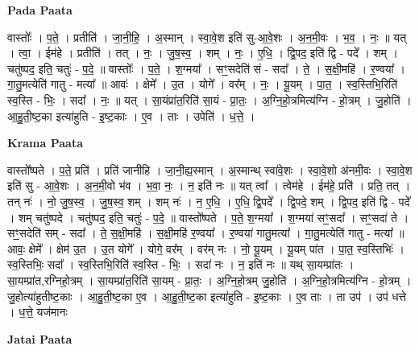 \documentclass[17pt]{extarticle}
\begin{document}
\textbf{Pada Paata} \newline

वास्तोः᳚ । प॒ते॒ । प्रतीति॑ । जा॒नी॒हि॒ । अ॒स्मान् । स्वा॒वे॒श इति॑ सु-आ॒वे॒शः । अ॒न॒मी॒वः । भ॒व॒ । नः॒ ॥ यत् । त्वा॒ । ईम॑हे । प्रतीति॑ । तत् । नः॒ । जु॒ष॒स्व॒ । शम् । नः॒ । ए॒धि॒ । द्वि॒पद॒ इति॑ द्वि - पदे᳚ । शम् । चतु॑ष्पद॒ इति॒ चतुः॑ - प॒दे॒ ॥ वास्तोः᳚ । प॒ते॒ । श॒ग्मया᳚ । सꣳ॒॒सदेति॑ सं - सदा᳚ । ते॒ । स॒क्षी॒महि॑ । र॒ण्वया᳚ । गा॒तु॒मत्येति॑ गातु - मत्या᳚ ॥ आवः॑ । क्षेमे᳚ । उ॒त । योगे᳚ । वर᳚म् । नः॒ । यू॒यम् । पा॒त॒ । स्व॒स्तिभि॒रिति॑ स्व॒स्ति - भिः॒ । सदा᳚ । नः॒ ॥ यत् । सा॒यंप्रा॑त॒रिति॑ सा॒यं - प्रा॒तः॒ । अ॒ग्नि॒हो॒त्रमित्य॑ग्नि - हो॒त्रम् । जु॒होति॑ । आ॒हु॒ती॒ष्ट॒का इत्या॑हुति - इ॒ष्ट॒काः । ए॒व । ताः । उपेति॑ । ध॒त्ते॒ ।  \newline


\textbf{Krama Paata} \newline

वास्तो᳚ष्पते । प॒ते॒ प्रति॑ । प्रति॑ जानीहि । जा॒नी॒ह्य॒स्मान् । अ॒स्मान्थ् स्वा॑वे॒शः । स्वा॒वे॒शो अ॑नमी॒वः । स्वा॒वे॒श इति॑ सु - आ॒वे॒शः । अ॒न॒मी॒वो भ॑व । भ॒वा॒ नः॒ । न॒ इति॑ नः ॥ यत् त्वा᳚ । त्वेम॑हे । ईम॑हे॒ प्रति॑ । प्रति॒ तत् । तन् नः॑ । नो॒ जु॒ष॒स्व॒ । जु॒ष॒स्व॒ शम् । शम् नः॑ । न॒ ए॒धि॒ । ए॒धि॒ द्वि॒पदे᳚ । द्वि॒पदे॒ शम् । द्वि॒पद॒ इति॑ द्वि - पदे᳚ । शम् चतु॑ष्पदे । चतु॑ष्पद॒ इति॒ चतुः॑ - प॒दे॒ ॥ वास्तो᳚ष्पते । प॒ते॒ श॒ग्मया᳚ । श॒ग्मया॑ सꣳ॒॒सदा᳚ । सꣳ॒॒सदा॑ ते । सꣳ॒॒सदेति॑ सम् - सदा᳚ । ते॒ स॒क्षी॒महि॑ । स॒क्षी॒महि॑ र॒ण्वया᳚ । र॒ण्वया॑ गातु॒मत्या᳚ । गा॒तु॒मत्येति॑ गातु - मत्या᳚ ॥ आवः॒ क्षेमे᳚ । क्षेम॑ उ॒त । उ॒त योगे᳚ । योगे॒ वर᳚म् । वर॑म् नः । नो॒ यू॒यम् । यू॒यम् पा॑त । पा॒त॒ स्व॒स्तिभिः॑ । स्व॒स्तिभिः॒ सदा᳚ । स्व॒स्तिभि॒रिति॑ स्व॒स्ति - भिः॒ । सदा॑ नः । न॒ इति॑ नः ॥ यथ् सा॒यम्प्रा॑तः । सा॒यम्प्रा॑त,रग्निहो॒त्रम् । सा॒यम्प्रा॑त॒रिति॑ सा॒यम् - प्रा॒तः॒ । अ॒ग्नि॒हो॒त्रम् जु॒होति॑ । अ॒ग्नि॒हो॒त्रमित्य॑ग्नि - हो॒त्रम् । जु॒होत्या॑हुतीष्ट॒काः । आ॒हु॒ती॒ष्ट॒का ए॒व । आ॒हु॒ती॒ष्ट॒का इत्या॑हुति - इ॒ष्ट॒काः । ए॒व ताः । ता उप॑ । उप॑ धत्ते । ध॒त्ते॒ यज॑मानः \newline

\textbf{Jatai Paata} \newline
\end{document}
